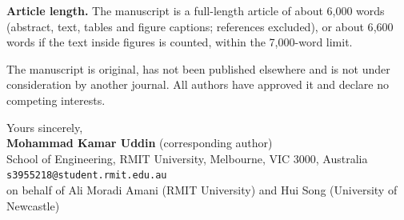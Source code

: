 \documentclass[11pt]{article}
\begin{document}
\textbf{Article length.} The manuscript is a full-length article of about 6{,}000 words (abstract, text,
tables and figure captions; references excluded), or about 6{,}600 words if the text inside figures is
counted, within the 7{,}000-word limit.

The manuscript is original, has not been published elsewhere and is not under consideration by another
journal. All authors have approved it and declare no competing interests.

\medskip
\noindent Yours sincerely, \\[1em]
\textbf{Mohammad Kamar Uddin} (corresponding author) \\
School of Engineering, RMIT University, Melbourne, VIC 3000, Australia \\
\texttt{s3955218@student.rmit.edu.au} \\[0.5em]
on behalf of Ali Moradi Amani (RMIT University) and Hui Song (University of Newcastle)
\end{document}
